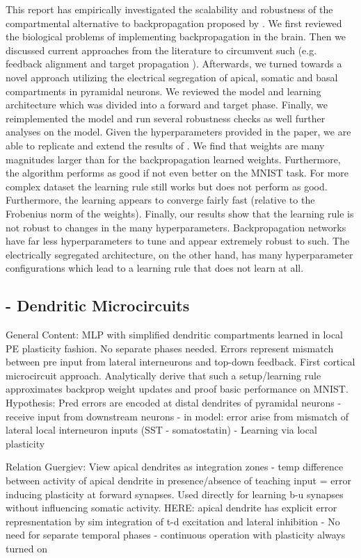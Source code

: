 \documentclass[colorinlistoftodos]{article}
\theoremstyle{definition}
\begin{document}
This report has empirically investigated the scalability and robustness of the compartmental alternative to backpropagation proposed by \citet{guerguiev2017}. We first reviewed the biological problems of implementing backpropagation in the brain. Then we discussed current approaches from the literature to circumvent such (e.g. feedback alignment \citep{lillicrap2016} and target propagation \citep{lee2015}). Afterwards, we turned towards a novel approach utilizing the electrical segregation of apical, somatic and basal compartments in pyramidal neurons. We reviewed the model and learning architecture which was divided into a forward and target phase. 
Finally, we reimplemented the model and run several robustness checks as well further analyses on the model. Given the hyperparameters provided in the paper, we are able to replicate and extend the results of \citet{guerguiev2017}. We find that weights are many magnitudes larger than for the backpropagation learned weights. Furthermore, the algorithm performs as good if not even better on the MNIST task. 
For more complex dataset the learning rule still works but does not perform as good. Furthermore, the learning appears to converge fairly fast (relative to the Frobenius norm of the weights).
Finally, our results show that the learning rule is not robust to changes in the many hyperparameters. Backpropagation networks have far less hyperparameters to tune and appear extremely robust to such. The electrically segregated architecture, on the other hand, has many hyperparameter configurations which lead to a learning rule that does not learn at all.

\subsection*{\citet{sacramento2018} - Dendritic Microcircuits}

General Content: MLP with simplified dendritic compartments learned in local PE plasticity fashion. No separate phases needed. Errors represent mismatch between pre input from lateral interneurons and top-down feedback. First cortical microcircuit approach. Analytically derive that such a setup/learning rule approximates backprop weight updates and proof basic performance on MNIST. Hypothesis: Pred errors are encoded at distal dendrites of pyramidal neurons - receive input from downstream neurons - in model: error arise from mismatch of lateral local interneuron inputs (SST - somatostatin) - Learning via local plasticity

Relation Guergiev: View apical dendrites as integration zones - temp difference between activity of apical dendrite in presence/absence of teaching input = error inducing plasticity at forward synapses. Used directly for learning b-u synapses without influencing somatic activity. HERE: apical dendrite has explicit error represnentation by sim integration of t-d excitation and lateral inhibition - No need for separate temporal phases - continuous operation with plasticity always turned on
\end{document}
